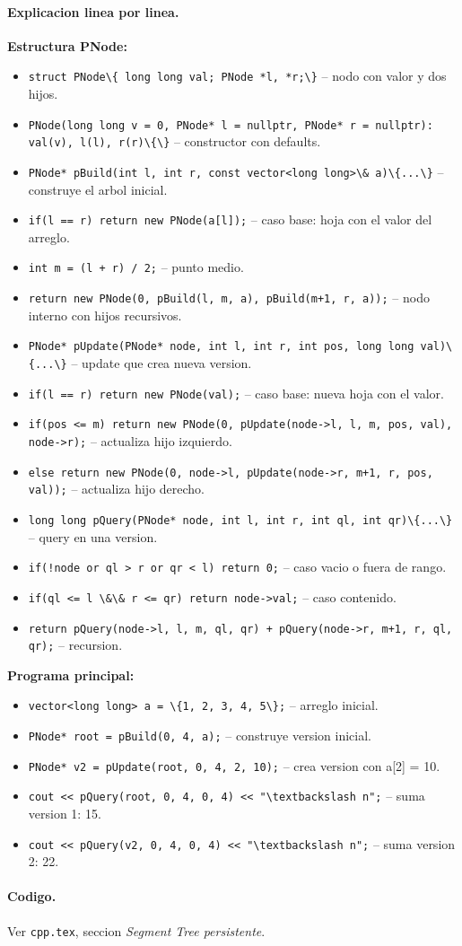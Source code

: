 \paragraph{Explicacion linea por linea.}
\textbf{Estructura PNode:}
\begin{itemize}\setlength\itemsep{0pt}
	\item \verb|struct PNode\{ long long val; PNode *l, *r;\}| -- nodo con valor y dos hijos.
	\item \verb|PNode(long long v = 0, PNode* l = nullptr, PNode* r = nullptr): val(v), l(l), r(r)\{\}| -- constructor con defaults.
	\item \verb|PNode* pBuild(int l, int r, const vector<long long>\& a)\{...\}| -- construye el arbol inicial.
	\item \verb|if(l == r) return new PNode(a[l]);| -- caso base: hoja con el valor del arreglo.
	\item \verb|int m = (l + r) / 2;| -- punto medio.
	\item \verb|return new PNode(0, pBuild(l, m, a), pBuild(m+1, r, a));| -- nodo interno con hijos recursivos.
	\item \verb|PNode* pUpdate(PNode* node, int l, int r, int pos, long long val)\{...\}| -- update que crea nueva version.
	\item \verb|if(l == r) return new PNode(val);| -- caso base: nueva hoja con el valor.
	\item \verb|if(pos <= m) return new PNode(0, pUpdate(node->l, l, m, pos, val), node->r);| -- actualiza hijo izquierdo.
	\item \verb|else return new PNode(0, node->l, pUpdate(node->r, m+1, r, pos, val));| -- actualiza hijo derecho.
	\item \verb|long long pQuery(PNode* node, int l, int r, int ql, int qr)\{...\}| -- query en una version.
	\item \verb|if(!node or ql > r or qr < l) return 0;| -- caso vacio o fuera de rango.
	\item \verb|if(ql <= l \&\& r <= qr) return node->val;| -- caso contenido.
	\item \verb|return pQuery(node->l, l, m, ql, qr) + pQuery(node->r, m+1, r, ql, qr);| -- recursion.
\end{itemize}
\textbf{Programa principal:}
\begin{itemize}\setlength\itemsep{0pt}
	\item \verb|vector<long long> a = \{1, 2, 3, 4, 5\};| -- arreglo inicial.
	\item \verb|PNode* root = pBuild(0, 4, a);| -- construye version inicial.
	\item \verb|PNode* v2 = pUpdate(root, 0, 4, 2, 10);| -- crea version con a[2] = 10.
	\item \verb|cout << pQuery(root, 0, 4, 0, 4) << "\textbackslash n";| -- suma version 1: 15.
	\item \verb|cout << pQuery(v2, 0, 4, 0, 4) << "\textbackslash n";| -- suma version 2: 22.
\end{itemize}

\paragraph{Codigo.}
Ver \texttt{cpp.tex}, seccion \textit{Segment Tree persistente}.

\vspace{0.5em}